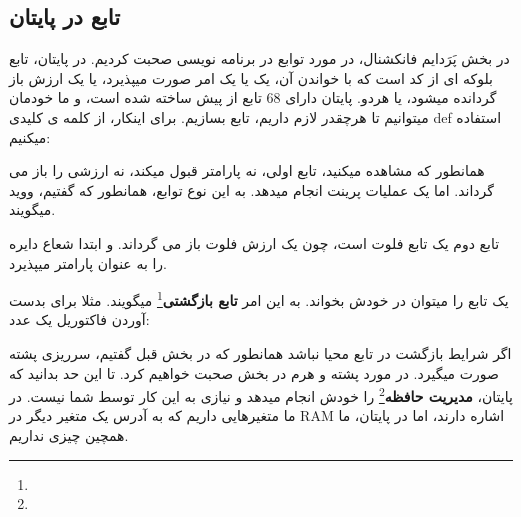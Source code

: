 \documentclass[14pt,a4paper]{memoir}
\begin{document}
	 
	 
	\subsection{تابع در پایتان}\label{pyfunc}
	در بخش پَرَدایم فانکشنال، در مورد توابع در برنامه نویسی صحبت کردیم. در پایتان، تابع بلوکه ای از کد است که با خواندن آن، یک یا یک امر صورت میپذیرد، یا یک ارزش باز گردانده میشود، یا هردو. پایتان دارای 68 تابع از پیش ساخته شده است، و ما خودمان میتوانیم تا هرچقدر لازم داریم، تابع بسازیم. برای اینکار، از کلمه ی کلیدی def استفاده میکنیم:
	 
	 
	 \begin{latin}
	
\end{latin}


	 
همانطور که مشاهده میکنید، تابع اولی، نه پارامتر قبول میکند، نه ارزشی را باز می گرداند. اما یک عملیات پرینت انجام میدهد. به این نوع توابع، همانطور که گفتیم، ووید میگویند.

تابع دوم یک تابع فلوت است، چون یک ارزش فلوت باز می گرداند. و ابتدا شعاع دایره را به عنوان پارامتر میپذیرد.

یک تابع را میتوان در خودش بخواند. به این امر \textbf{تابع بازگشتی}\footnote{} میگویند. مثلا برای بدست آوردن فاکتوریل یک عدد:



	 
	 
	 \begin{latin}
	
\end{latin}
	 
	 
	 اگر شرایط بازگشت در تابع محیا نباشد همانطور که در بخش قبل گفتیم، سرریزی پشته صورت میگیرد. در مورد پشته و هرم در بخش  صحبت خواهیم کرد. تا این حد بدانید که پایتان، \textbf{مدیریت حافظه}\footnote{} را خودش انجام میدهد و نیازی به این کار توسط شما نیست. در  ما متغیرهایی داریم که به آدرس یک متغیر دیگر در RAM اشاره دارند، اما در پایتان، ما همچین چیزی نداریم.
	 
\end{document}
